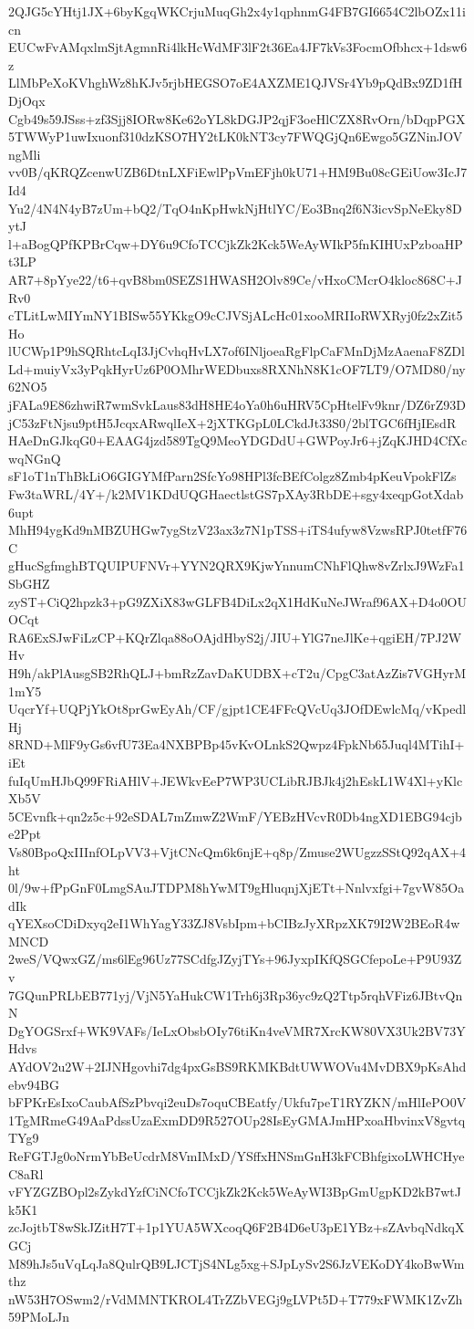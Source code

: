 2QJG5cYHtj1JX+6byKgqWKCrjuMuqGh2x4y1qphnmG4FB7GI6654C2lbOZx11icn
EUCwFvAMqxlmSjtAgmnRi4lkHcWdMF3lF2t36Ea4JF7kVs3FocmOfbhcx+1dsw6z
LlMbPeXoKVhghWz8hKJv5rjbHEGSO7oE4AXZME1QJVSr4Yb9pQdBx9ZD1fHDjOqx
Cgb49s59JSss+zf3Sjj8IORw8Ke62oYL8kDGJP2qjF3oeHlCZX8RvOrn/bDqpPGX
5TWWyP1uwIxuonf310dzKSO7HY2tLK0kNT3cy7FWQGjQn6Ewgo5GZNinJOVngMli
vv0B/qKRQZcenwUZB6DtnLXFiEwlPpVmEFjh0kU71+HM9Bu08cGEiUow3IcJ7Id4
Yu2/4N4N4yB7zUm+bQ2/TqO4nKpHwkNjHtlYC/Eo3Bnq2f6N3icvSpNeEky8DytJ
l+aBogQPfKPBrCqw+DY6u9CfoTCCjkZk2Kck5WeAyWIkP5fnKIHUxPzboaHPt3LP
AR7+8pYye22/t6+qvB8bm0SEZS1HWASH2Olv89Ce/vHxoCMcrO4kloc868C+JRv0
cTLitLwMIYmNY1BISw55YKkgO9cCJVSjALcHc01xooMRIIoRWXRyj0fz2xZit5Ho
lUCWp1P9hSQRhtcLqI3JjCvhqHvLX7of6INljoeaRgFlpCaFMnDjMzAaenaF8ZDl
Ld+muiyVx3yPqkHyrUz6P0OMhrWEDbuxs8RXNhN8K1cOF7LT9/O7MD80/ny62NO5
jFALa9E86zhwiR7wmSvkLaus83dH8HE4oYa0h6uHRV5CpHtelFv9knr/DZ6rZ93D
jC53zFtNjsu9ptH5JcqxARwqlIeX+2jXTKGpL0LCkdJt33S0/2blTGC6fHjIEsdR
HAeDnGJkqG0+EAAG4jzd589TgQ9MeoYDGDdU+GWPoyJr6+jZqKJHD4CfXcwqNGnQ
sF1oT1nThBkLiO6GIGYMfParn2SfcYo98HPl3fcBEfColgz8Zmb4pKeuVpokFlZs
Fw3taWRL/4Y+/k2MV1KDdUQGHaectlstGS7pXAy3RbDE+sgy4xeqpGotXdab6upt
MhH94ygKd9nMBZUHGw7ygStzV23ax3z7N1pTSS+iTS4ufyw8VzwsRPJ0tetfF76C
gHucSgfmghBTQUIPUFNVr+YYN2QRX9KjwYnnumCNhFlQhw8vZrlxJ9WzFa1SbGHZ
zyST+CiQ2hpzk3+pG9ZXiX83wGLFB4DiLx2qX1HdKuNeJWraf96AX+D4o0OUOCqt
RA6ExSJwFiLzCP+KQrZlqa88oOAjdHbyS2j/JIU+YlG7neJlKe+qgiEH/7PJ2WHv
H9h/akPlAusgSB2RhQLJ+bmRzZavDaKUDBX+cT2u/CpgC3atAzZis7VGHyrM1mY5
UqcrYf+UQPjYkOt8prGwEyAh/CF/gjpt1CE4FFcQVcUq3JOfDEwlcMq/vKpedlHj
8RND+MlF9yGs6vfU73Ea4NXBPBp45vKvOLnkS2Qwpz4FpkNb65Juql4MTihI+iEt
fuIqUmHJbQ99FRiAHlV+JEWkvEeP7WP3UCLibRJBJk4j2hEskL1W4Xl+yKlcXb5V
5CEvnfk+qn2z5c+92eSDAL7mZmwZ2WmF/YEBzHVcvR0Db4ngXD1EBG94cjbe2Ppt
Vs80BpoQxIIInfOLpVV3+VjtCNcQm6k6njE+q8p/Zmuse2WUgzzSStQ92qAX+4ht
0l/9w+fPpGnF0LmgSAuJTDPM8hYwMT9gHluqnjXjETt+Nnlvxfgi+7gvW85OadIk
qYEXsoCDiDxyq2eI1WhYagY33ZJ8VsbIpm+bCIBzJyXRpzXK79I2W2BEoR4wMNCD
2weS/VQwxGZ/ms6lEg96Uz77SCdfgJZyjTYs+96JyxpIKfQSGCfepoLe+P9U93Zv
7GQunPRLbEB771yj/VjN5YaHukCW1Trh6j3Rp36yc9zQ2Ttp5rqhVFiz6JBtvQnN
DgYOGSrxf+WK9VAFs/IeLxObsbOIy76tiKn4veVMR7XrcKW80VX3Uk2BV73YHdvs
AYdOV2u2W+2IJNHgovhi7dg4pxGsBS9RKMKBdtUWWOVu4MvDBX9pKsAhdebv94BG
bFPKrEsIxoCaubAfSzPbvqi2euDs7oquCBEatfy/Ukfu7peT1RYZKN/mHlIePO0V
1TgMRmeG49AaPdssUzaExmDD9R527OUp28IsEyGMAJmHPxoaHbvinxV8gvtqTYg9
ReFGTJg0oNrmYbBeUcdrM8VmIMxD/YSffxHNSmGnH3kFCBhfgixoLWHCHyeC8aRl
vFYZGZBOpl2sZykdYzfCiNCfoTCCjkZk2Kck5WeAyWI3BpGmUgpKD2kB7wtJk5K1
zcJojtbT8wSkJZitH7T+1p1YUA5WXcoqQ6F2B4D6eU3pE1YBz+sZAvbqNdkqXGCj
M89hJs5uVqLqJa8QulrQB9LJCTjS4NLg5xg+SJpLySv2S6JzVEKoDY4koBwWmthz
nW53H7OSwm2/rVdMMNTKROL4TrZZbVEGj9gLVPt5D+T779xFWMK1ZvZh59PMoLJn

